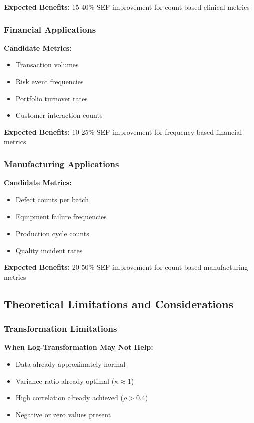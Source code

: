 \textbf{Expected Benefits:} 15-40\% SEF improvement for count-based clinical metrics

\subsubsection{Financial Applications}

\textbf{Candidate Metrics:}
\begin{itemize}
    \item Transaction volumes
    \item Risk event frequencies
    \item Portfolio turnover rates
    \item Customer interaction counts
\end{itemize}

\textbf{Expected Benefits:} 10-25\% SEF improvement for frequency-based financial metrics

\subsubsection{Manufacturing Applications}

\textbf{Candidate Metrics:}
\begin{itemize}
    \item Defect counts per batch
    \item Equipment failure frequencies
    \item Production cycle counts
    \item Quality incident rates
\end{itemize}

\textbf{Expected Benefits:} 20-50\% SEF improvement for count-based manufacturing metrics

\subsection{Theoretical Limitations and Considerations}

\subsubsection{Transformation Limitations}

\textbf{When Log-Transformation May Not Help:}
\begin{itemize}
    \item Data already approximately normal
    \item Variance ratio already optimal ($\kappa \approx 1$)
    \item High correlation already achieved ($\rho > 0.4$)
    \item Negative or zero values present
\end{itemize}

